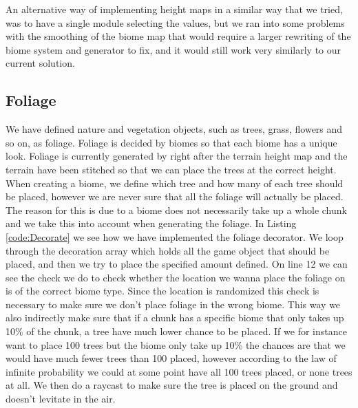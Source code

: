 An alternative way of implementing height maps in a similar way that we tried, was to have a single module selecting the values, but we ran into some problems with the smoothing of the biome map that would require a larger rewriting of the biome system and generator to fix, and it would still work very similarly to our current solution. %


\subsection{Foliage}

We have defined nature and vegetation objects, such as trees, grass, flowers and so on, as foliage. Foliage is decided by biomes so that each biome has a unique look. Foliage is currently generated by right after the terrain height map and the terrain have been stitched so that we can place the trees at the correct height. When creating a biome, we define which tree and how many of each tree should be placed, however we are never sure that all the foliage will actually be placed. The reason for this is due to a biome does not necessarily take up a whole chunk and we take this into account when generating the foliage. In Listing \ref{code:Decorate} we see how we have implemented the foliage decorator. We loop through the decoration array which holds all the game object that should be placed, and then we try to place the specified amount defined. On line 12 we can see the check we do to check whether the location we wanna place the foliage on is of the correct biome type. Since the location is randomized this check is necessary to make sure we don't place foliage in the wrong biome. This way we also indirectly make sure that if a chunk has a specific biome that only takes up 10\% of the chunk, a tree have much lower chance to be placed. If we for instance want to place 100 trees but the biome only take up 10\% the chances are that we would have much fewer trees than 100 placed, however according to the law of infinite probability we could at some point have all 100 trees placed, or none trees at all. We then do a raycast to make sure the tree is placed on the ground and doesn't levitate in the air.

